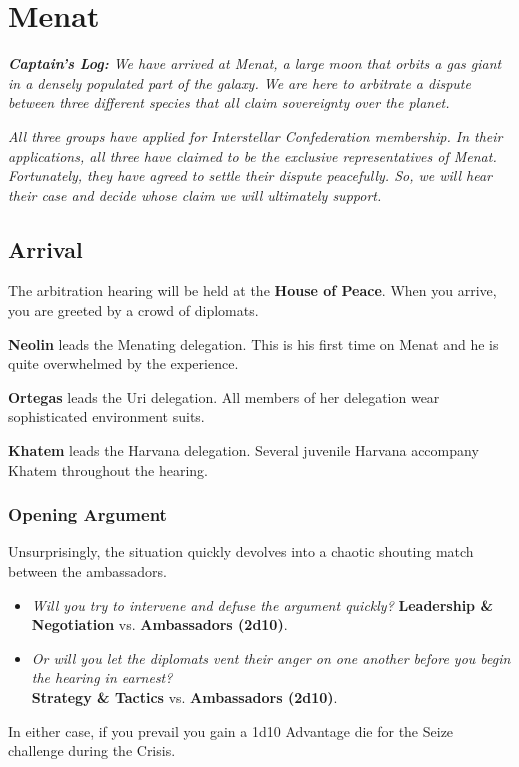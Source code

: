 \documentclass[11pt, a5paper, parskip=half-, DIV=12]{scrartcl}
\begin{document}
\section*{Menat}
\textit{\textbf{Captain's Log:} We have arrived at Menat,
a large moon that orbits a gas giant in a densely populated part of the galaxy.  
We are here to arbitrate a dispute between three different species that all claim sovereignty over the planet.}

\textit{All three groups have applied for Interstellar Confederation membership. In their applications, all three have claimed to be the exclusive representatives of Menat. Fortunately, they have agreed to settle their dispute peacefully. So, we will hear their case and decide whose claim we will ultimately support.}%

\subsection*{Arrival}
The arbitration hearing will be held at the \textbf{House of Peace}. When you arrive, you are greeted by a crowd of diplomats.  

\textbf{Neolin} leads the Menating delegation. This is his first time on Menat and he is quite overwhelmed by the experience.

\textbf{Ortegas} leads the Uri delegation. All members of her delegation wear sophisticated environment suits. 

\textbf{Khatem} leads the Harvana delegation. Several juvenile Harvana accompany Khatem throughout the hearing.

\subsubsection*{Opening Argument}
Unsurprisingly, the situation quickly devolves into a chaotic shouting match between the ambassadors.
\begin{itemize}
	\item \textit{Will you try to intervene and defuse the argument quickly?} \textbf{Leadership \& Negotiation} vs. \textbf{Ambassadors (2d10)}.
	\item \textit{Or will you let the diplomats vent their anger on one another before you begin the hearing in earnest?} \\ \textbf{Strategy \& Tactics} vs. \textbf{Ambassadors (2d10)}.
\end{itemize}
In either case, if you prevail you gain a 1d10 Advantage die for the Seize challenge during the Crisis.
\newpage
\end{document}
